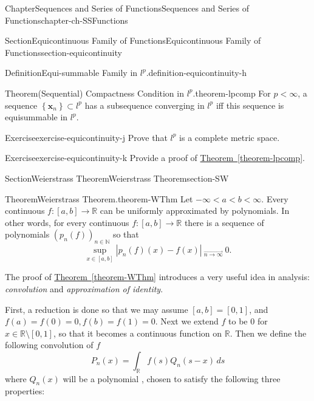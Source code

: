 \documentclass[oneside,10pt,]{book}
\newcommand{\xreffont}{\relax}
\numberwithin{equation}{section}
\begin{document}
\begin{chapterptx}{Chapter}{Sequences and Series of Functions}{}{Sequences and Series of Functions}{}{}{chapter-ch-SSFunctions}
\begin{sectionptx}{Section}{Equicontinuous Family of Functions}{}{Equicontinuous Family of Functions}{}{}{section-equicontinuity}
\begin{definition}{Definition}{Equi-summable Family in \(l^{p}\).}{definition-equicontinuity-h}
\begin{equation}
\end{equation}
%
\end{definition}
\begin{theorem}{Theorem}{(Sequential) Compactness Condition in \(l^{p}\).}{}{theorem-lpcomp}%
For \(p < \infty\), a sequence \(\left\{{\mathbf x}_{n}\right\} \subset l^{p}\) has a subsequence converging in \(l^{p}\) iff this sequence is equisummable in \(l^{p}\).%
\end{theorem}
\begin{inlineexercise}{Exercise}{}{exercise-equicontinuity-j}%
Prove that \(l^{p}\) is a complete metric space.%
\end{inlineexercise}%
\begin{inlineexercise}{Exercise}{}{exercise-equicontinuity-k}%
Provide a proof of \hyperref[theorem-lpcomp]{Theorem~{\xreffont\ref{theorem-lpcomp}}}.%
\end{inlineexercise}%
\end{sectionptx}
%
%
\typeout{************************************************}
\typeout{************************************************}
%
\begin{sectionptx}{Section}{Weierstrass Theorem}{}{Weierstrass Theorem}{}{}{section-SW}
\begin{theorem}{Theorem}{Weierstrass Theorem.}{}{theorem-WThm}%
Let \(-\infty < a < b < \infty\). Every continuous  \(f:[a,b]\to\mathbb R\) can be uniformly approximated by polynomials.   In other words, for every continuous \(f:[a,b] \to \mathbb{R}\) there is a sequence of polynomials \((p_n(f))_{n \in \mathbb{N}}\) so that%
\begin{equation*}
\sup_{x \in [a,b]}|p_n(f)(x)-f(x)|   \ _{\overrightarrow{n \to \infty}}\ 0.
\end{equation*}
\end{theorem}
The proof  of \hyperref[theorem-WThm]{Theorem~{\xreffont\ref{theorem-WThm}}} introduces a very useful idea in analysis: \emph{convolution} and \emph{approximation of identity}.%
\par
First, a reduction is done so that we may assume \([a, b]=[0, 1]\), and \(f(a)=f(0)=0, f(b)=f(1)=0\). Next we extend \(f\) to be \(0\) for \(x\in \mathbb R\setminus [0, 1]\), so that it becomes a continuous function on \(\mathbb R\). Then we define the following  convolution of \(f\)%
\begin{equation*}
P_{n}(x)=\int_{\mathbb R} f(s)Q_{n}(s-x)\, ds
\end{equation*}
where \(Q_{n}(x)\) will be a polynomial , chosen to satisfy the following three properties:%

\end{sectionptx}
\end{chapterptx}
\end{document}
